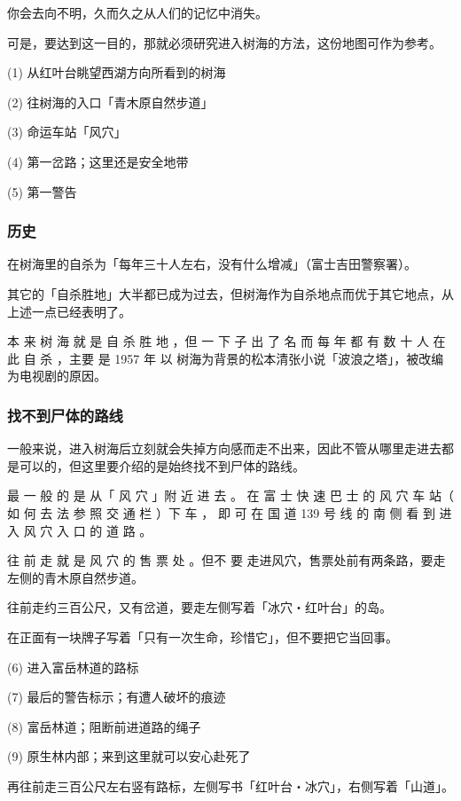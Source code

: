\documentclass[UTF8]{ctexart}
\begin{document}
你会去向不明，久而久之从人们的记忆中消失。

可是，要达到这一目的，那就必须研究进入树海的方法，这份地图可作为参考。

(1) 从红叶台眺望西湖方向所看到的树海

(2) 往树海的入口「青木原自然步道」

(3) 命运车站「风穴」

(4) 第一岔路；这里还是安全地带

(5) 第一警告

\subsubsection{历史}

在树海里的自杀为「每年三十人左右，没有什么增减」（富士吉田警察署）。

其它的「自杀胜地」大半都已成为过去，但树海作为自杀地点而优于其它地点，从上述一点已经表明了。

本 来 树 海 就 是 自 杀 胜 地 ，但 一 下 子 出 了 名 而 每 年 都 有 数 十 人 在 此 自 杀 ，主要 是 1957 年 以 树海为背景的松本清张小说「波浪之塔」，被改编为电视剧的原因。

\subsubsection{找不到尸体的路线}

一般来说，进入树海后立刻就会失掉方向感而走不出来，因此不管从哪里走进去都是可以的，但这里要介绍的是始终找不到尸体的路线。

最 一 般 的 是 从「 风 穴 」附 近 进 去 。
在 富 士 快 速 巴 士 的 风 穴 车 站（ 如 何 去 法 参 照 交 通 栏 ）下 车 ， 即 可 在 国 道 139 号 线 的 南 侧 看 到 进 入 风 穴 入 口 的 道 路 。

往 前 走 就 是 风 穴 的 售 票 处 。但不 要 走进风穴，售票处前有两条路，要走左侧的青木原自然步道。 

往前走约三百公尺，又有岔道，要走左侧写着「冰穴‧红叶台」的岛。

在正面有一块牌子写着「只有一次生命，珍惜它」，但不要把它当回事。

(6) 进入富岳林道的路标

(7) 最后的警告标示；有遭人破坏的痕迹

(8) 富岳林道；阻断前进道路的绳子

(9) 原生林内部；来到这里就可以安心赴死了

再往前走三百公尺左右竖有路标，左侧写书「红叶台‧冰穴」，右侧写着「山道」。
\end{document}
